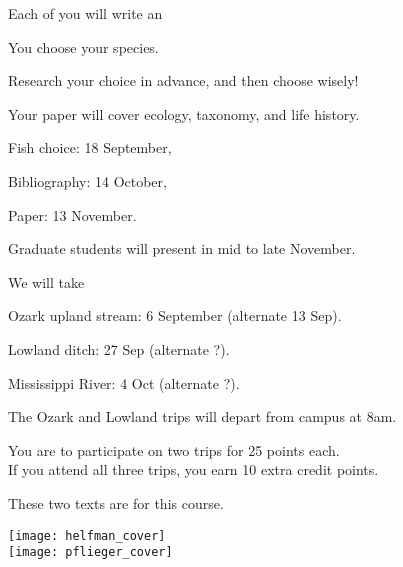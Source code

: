 \documentclass[t]{beamer}
\begin{document}
\begin{frame}[t,plain]{Each of you will write an }

	\hangpara You choose your species.
	
	\hspace{2em} Research your choice in advance, and then choose wisely! 

	\hangpara Your paper will cover ecology, taxonomy, and life history.

	\hangpara {}
	
	\hspace{2em} Fish choice: 18 September,
	
	\hspace{2em} Bibliography: 14 October,
	
	\hspace{2em} Paper: 13 November.
	
	\hangpara Graduate students will present in mid to late November.

\end{frame}

\begin{frame}[t,plain]{We will take }

	\hangpara Ozark upland stream: 6 September (alternate 13 Sep). 
	
	\hangpara Lowland ditch: 27 Sep (alternate ?).

	\hangpara Mississippi River: 4 Oct (alternate ?). 


	\hangpara
	
	\hangpara The Ozark and Lowland trips will depart from campus at 8am.
	
	\hangpara You are  to participate on two trips for 25 points each.\\ If you attend all three trips, you earn 10  extra credit points.
	
\end{frame}

\begin{frame}[t,plain]{These two texts are  for this course.}
\begin{multicols}{2}
	\begin{center}
		\texttt{[image: helfman\_cover]} \\
		\texttt{[image: pflieger\_cover]} \\
	\end{center}
\end{multicols}
\end{frame}
\end{document}
